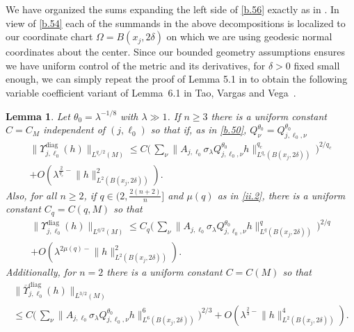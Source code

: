 \documentclass[10pt]{amsart}
\newtheorem{lemma}[theorem]{Lemma}
\newcommand{\la}{\lambda}
\newcommand{\1}{{\bf 1}}
\newcommand{\diag}{\Upsilon^{\text{diag}}}
\newcommand{\diagbar}{\overline\Upsilon^{\text{diag}}}
\begin{document}


We have organized the sums expanding the left side of \eqref{b.56} exactly as in \cite{HSp}.  In view of \eqref{b.54} each of the summands in the above decompositions
is localized to our coordinate chart $\Omega=B(x_j,2\delta)$ on which we are using geodesic normal coordinates about the center.  Since our bounded geometry assumptions
ensures we have uniform control of the metric and its derivatives, for $\delta>0$ fixed small enough, we can simply repeat the proof of Lemma 5.1 in \cite{HSp} to obtain the following 
variable coefficient variant of Lemma~6.1 in Tao, Vargas and Vega~\cite{TaoVargasVega}.




\begin{lemma}\label{lemma1}  Let $\theta_0=\la^{-1/8}$ with $\la \gg 1$.
If $n\ge3$ there is a uniform constant $C=C_M$ independent of $(j,\ell_0)$  so that
if, as in \eqref{b.50}, $Q^{\theta_0}_\nu=Q^{\theta_0}_{j,\ell_0,\nu}$
\begin{multline}\label{b.65}
\bigl\| \diag_{j,\ell_0}(h) \bigr\|_{L^{q_c/2}(M)}
\le C\bigl( \, \sum_\nu \bigl\| A_{j,\ell_0}\sigma_\la Q^{\theta_0}_{j,\ell_0,\nu} h\bigr\|^{q_c}_{L^{q_c}(B(x_j,2\delta))}\, \bigr)^{2/q_c}
\\+O(\la^{\frac2{q_c}-}\|h\|^2_{L^2(B(x_j,2\delta))}).
\end{multline}
Also, for all $n\ge2$, if $q\in (2,\tfrac{2(n+2)}n]$ and $\mu(q)$ as in \eqref{ii.2},  there is a uniform constant
$C_q=C(q,M)$ so that
\begin{multline}\label{b.66}
\bigl\| \diag_{j,\ell_0}(h) \bigr\|_{L^{q/2}(M)}
\le C_q \bigl( \, \sum_\nu \bigl\| A_{j,\ell_0}\sigma_\la Q^{\theta_0}_{j,\ell_0,\nu} h\bigr\|^{q}_{L^{q}(B(x_j,2\delta))}\, \bigr)^{2/q}
\\+O(\la^{2\mu(q)-}\|h\|^2_{L^2(B(x_j,2\delta))}).
\end{multline}
Additionally, for $n=2$ there is a uniform constant $C=C(M)$ so that
\begin{multline}\label{b.67}
\bigl\| \diagbar_{j,\ell_0}(h) \bigr\|_{L^{3/2}(M)}
\\
\le C\bigl( \, \sum_\nu \bigl\| A_{j,\ell_0}\sigma_\la Q^{\theta_0}_{j,\ell_0,\nu} h\|^6_{L^6(B(x_j,2\delta))}\bigr)^{2/3}
+O(\la^{\frac23-}\|h\|^4_{L^2(B(x_j,2\delta))}).
\end{multline}
\end{lemma}
\end{document}
